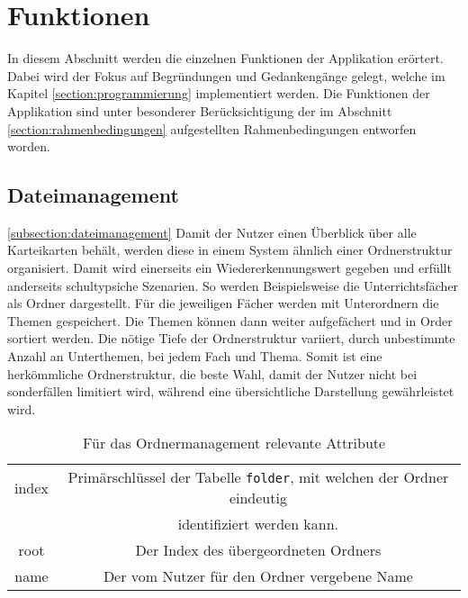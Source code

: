 
\section{Funktionen}
\label{section:funktionen}
In diesem Abschnitt werden die einzelnen Funktionen der Applikation erörtert. Dabei wird der Fokus auf Begründungen und Gedankengänge gelegt, welche im Kapitel \ref{section:programmierung} implementiert werden. Die Funktionen der Applikation sind unter besonderer Berücksichtigung der im Abschnitt \ref{section:rahmenbedingungen} aufgestellten Rahmenbedingungen entworfen worden.

\subsection{Dateimanagement}
\ref{subsection:dateimanagement}
Damit der Nutzer einen Überblick über alle Karteikarten behält, werden diese in einem System ähnlich einer Ordnerstruktur organisiert. Damit wird einerseits ein Wiedererkennungswert gegeben und erfüllt anderseits schultypsiche Szenarien. So werden Beispielsweise die Unterrichtsfächer als Ordner dargestellt. Für die jeweiligen Fächer werden mit Unterordnern die Themen gespeichert. Die Themen können dann weiter aufgefächert und in Order sortiert werden. Die nötige Tiefe der Ordnerstruktur variiert, durch unbestimmte Anzahl an Unterthemen, bei jedem Fach und Thema. Somit ist eine herkömmliche Ordnerstruktur, die beste Wahl, damit der Nutzer nicht bei sonderfällen limitiert wird, während eine übersichtliche Darstellung gewährleistet wird.

\begin{center}
    \begin{table}[H]
        \begin{tabular}{|c|c|}
            \hline
            index & Primärschlüssel der Tabelle \texttt{folder}, mit welchen der Ordner eindeutig \\ 
            & identifiziert werden kann. \\ 
            \hline
            root & Der Index des übergeordneten Ordners \\  
            \hline
            name & Der vom Nutzer für den Ordner vergebene Name \\
            \hline
        \end{tabular}
        \caption{\label{tab:attribute_ordnermanagement}Für das Ordnermanagement relevante Attribute}
    \end{table}
\end{center}


